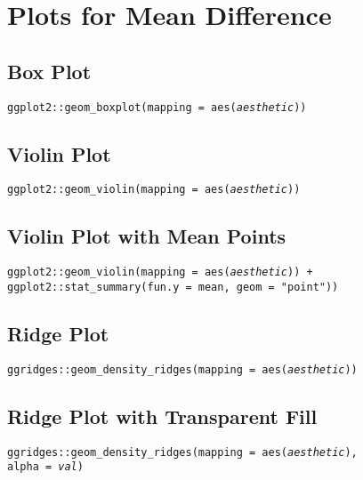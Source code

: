 \documentclass{tufte-handout}
\newenvironment{subs}
  {\adjustwidth{3em}{0pt}}
  {\endadjustwidth}
\begin{document}
\section{Plots for Mean Difference}
\begin{subs}
\subsection{Box Plot}
\noindent \texttt{ggplot2::}{\color{red}\texttt{geom\_boxplot}}\texttt{(mapping = aes(\textit{aesthetic}))}\\

\vspace{3mm}
\subsection{Violin Plot}
\noindent \texttt{ggplot2::}{\color{red}\texttt{geom\_violin}}\texttt{(mapping = aes(\textit{aesthetic}))}\\

\vspace{3mm}
\subsection{Violin Plot with Mean Points}
\noindent \texttt{ggplot2::}{\color{red}\texttt{geom\_violin}}\texttt{(mapping = aes(\textit{aesthetic})) +}\\
\noindent \texttt{ggplot2::}{\color{red}\texttt{stat\_summary}}\texttt{(fun.y = mean, geom = "point"))}

\vspace{3mm}
\subsection{Ridge Plot}
\noindent \texttt{ggridges::}{\color{red}\texttt{geom\_density\_ridges}}\texttt{(mapping = aes(\textit{aesthetic}))}\\

\vspace{3mm}
\subsection{Ridge Plot with Transparent Fill}
\noindent \texttt{ggridges::}{\color{red}\texttt{geom\_density\_ridges}}\texttt{(mapping = aes(\textit{aesthetic}),\\alpha = \textit{val})}\\


\end{subs}
\end{document}
